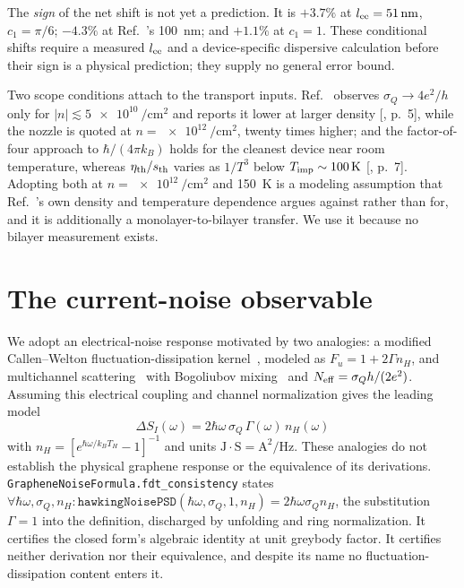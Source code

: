 \documentclass[aps,prl,twocolumn,superscriptaddress,nofootinbib]{revtex4-2}
\begin{document}
The \emph{sign} of the net shift is not yet a prediction. It is $+3.7\%$ at
$l_{\rm ee} = \SI{51}{\nano\meter}$, $c_1 = \pi/6$; $-4.3\%$ at
Ref.~\cite{Geurs2025}'s \SI{100}{\nano\meter}; and $+1.1\%$ at $c_1 = 1$.
These conditional shifts require a measured $l_{\rm ee}$ and a
device-specific dispersive calculation before their sign is a physical
prediction; they supply no general error bound.

Two scope conditions attach to the transport inputs.
Ref.~\cite{Majumdar2025} observes $\sigma_Q \to 4e^2/h$ only for
$|n| \lesssim \SI{5e10}{\per\centi\meter\squared}$ and reports it lower at
larger density [, p.~5], while the nozzle is quoted
at $n = \SI{e12}{\per\centi\meter\squared}$, twenty times higher; and the
factor-of-four approach to $\hbar/(4\pi k_B)$ holds for the cleanest device
near room temperature, whereas $\eta_{\rm th}/s_{\rm th}$ varies as $1/T^3$
below $T_{\rm imp} \sim \SI{100}{\kelvin}$
[, p.~7]. Adopting both at
$n = \SI{e12}{\per\centi\meter\squared}$ and \SI{150}{\kelvin} is a
modeling assumption that Ref.~\cite{Majumdar2025}'s own density and
temperature dependence argues against rather than for, and it is
additionally a monolayer-to-bilayer transfer. We use it because no bilayer
measurement exists.

\section{The current-noise observable}

We adopt an electrical-noise response motivated by two analogies:
a modified Callen--Welton fluctuation-dissipation
kernel~\cite{CallenWelton1951}, modeled as $F_u=1+2\Gamma n_H$, and multichannel scattering~\cite{Blanter2000}
with Bogoliubov mixing~\cite{AnantramDatta1996} and
$N_{\rm eff}=\sigma_Qh/(2e^2)$. Assuming this electrical coupling and
channel normalization gives the leading model
\begin{equation}
\boxed{\;\Delta S_I(\omega) = 2\hbar\omega\,\sigma_Q\,\Gamma(\omega)\,n_H(\omega)\;}
\label{eq:noise_psd}
\end{equation}
with $n_H=[e^{\hbar\omega/k_BT_H}-1]^{-1}$ and units
$\mathrm{J}\cdot\mathrm{S}=\mathrm{A}^2/\mathrm{Hz}$.
These analogies do not establish the physical graphene response or the
equivalence of its derivations.
\texttt{GrapheneNoiseFormula.fdt\_consistency} states
$\forall \hbar\omega, \sigma_Q, n_H:
\texttt{hawkingNoisePSD}(\hbar\omega,\sigma_Q,1,n_H)
= 2\hbar\omega\sigma_Q n_H$, the substitution $\Gamma = 1$ into the
definition, discharged by unfolding and ring normalization. It certifies
the closed form's algebraic identity at unit greybody factor. It certifies
neither derivation nor their equivalence, and despite its name no
fluctuation-dissipation content enters it.
\end{document}
